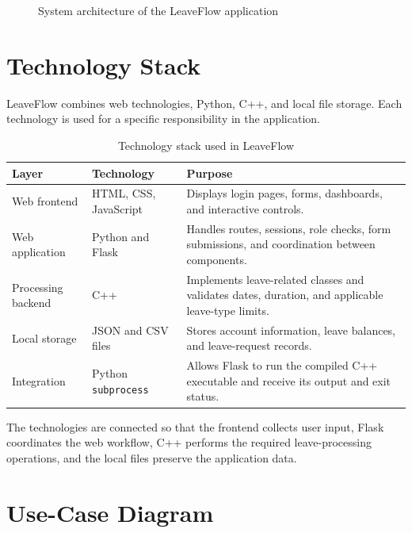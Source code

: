 \documentclass[12pt,a4paper,oneside]{book}
\begin{document}
\begin{figure}[htbp]
\caption{System architecture of the LeaveFlow application}

\label{fig:system-architecture}

\end{figure}



\section{Technology Stack}

LeaveFlow combines web technologies, Python, C++, and local file storage. Each technology is used for a specific responsibility in the application.

\begin{table}[htbp]
\centering
\renewcommand{\arraystretch}{1.25}
\begin{tabularx}{\textwidth}{|p{3.1cm}|p{3.2cm}|X|}
\hline
\textbf{Layer} & \textbf{Technology} & \textbf{Purpose} \\ \hline
Web frontend & HTML, CSS, JavaScript & Displays login pages, forms, dashboards, and interactive controls. \\ \hline
Web application & Python and Flask & Handles routes, sessions, role checks, form submissions, and coordination between components. \\ \hline
Processing backend & C++ & Implements leave-related classes and validates dates, duration, and applicable leave-type limits. \\ \hline
Local storage & JSON and CSV files & Stores account information, leave balances, and leave-request records. \\ \hline
Integration & Python \texttt{subprocess} & Allows Flask to run the compiled C++ executable and receive its output and exit status. \\ \hline
\end{tabularx}
\caption{Technology stack used in LeaveFlow}
\label{tab:technology-stack}
\end{table}

The technologies are connected so that the frontend collects user input, Flask coordinates the web workflow, C++ performs the required leave-processing operations, and the local files preserve the application data.


\section{Use-Case Diagram}
\end{document}

